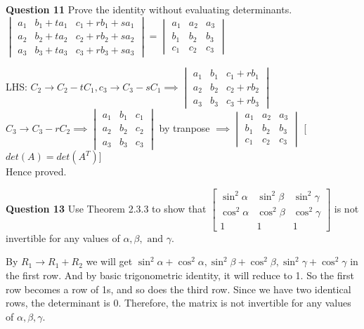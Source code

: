 \documentclass[addpoints]{exam}
\begin{document}
\begin{sloppypar}
\begin{questions}
        \question
        \textbf{Question 11} Prove the identity without evaluating determinants. \\ 
        $ \begin{vmatrix}
            a_1 & b_1 + ta_1 & c_1 + rb_1 + sa_1 \\ 
            a_2 & b_2 + ta_2 & c_2 + rb_2 + sa_2 \\ 
            a_3 & b_3 + ta_3 & c_3 + rb_3 + sa_3 
        \end{vmatrix} = \begin{vmatrix}
            a_1 & a_2 & a_3 \\ b_1 & b_2 & b_3 \\ c_1 & c_2 & c_3
        \end{vmatrix}$
        \begin{solution}
            LHS: $ C_2 \rightarrow C_2 - tC_1, c_3 \rightarrow C_3 - sC_1 \implies \begin{vmatrix}
                a_1 & b_1 & c_1 + rb_1 \\ 
                a_2 & b_2 & c_2 + rb_2 \\ 
                a_3 & b_3 & c_3 + rb_3 
            \end{vmatrix} $ \\ 
            $ C_3 \rightarrow C_3 - rC_2 \implies \begin{vmatrix}
                a_1 & b_1 & c_1 \\ 
                a_2 & b_2 & c_2 \\
                a_3 & b_3 & c_3 
            \end{vmatrix} $ by tranpose $ \implies \begin{vmatrix}
                a_1 & a_2 & a_3 \\ b_1 & b_2 & b_3 \\ c_1 & c_2 & c_3
            \end{vmatrix} $ [$det(A) = det(A^T)$] \\ 
            Hence proved.
        \end{solution}

        \question
        \textbf{Question 13} Use Theorem 2.3.3 to show that $ \begin{bmatrix}
            \sin^2\alpha & \sin^2\beta & \sin^2\gamma \\ 
            \cos^2\alpha & \cos^2\beta & \cos^2\gamma \\ 
            1 & 1 & 1 
        \end{bmatrix} $ is not invertible for any values of $ \alpha, \beta, \text{ and } \gamma $. 
        \begin{solution}
            By $ R_1 \rightarrow R_1 + R_2 $ we will get $ \sin^2\alpha + \cos^2\alpha, \sin^2\beta + \cos^2\beta, \sin^2\gamma + \cos^2\gamma $ in the first row. And by basic trigonometric identity, it will reduce to 1. So the first row becomes a row of 1s, and so does the third row. Since we have two identical rows, the determinant is 0. Therefore, the matrix is not invertible for any values of $ \alpha, \beta, \gamma $.
        \end{solution}


\end{questions}
\end{sloppypar}
\end{document}
